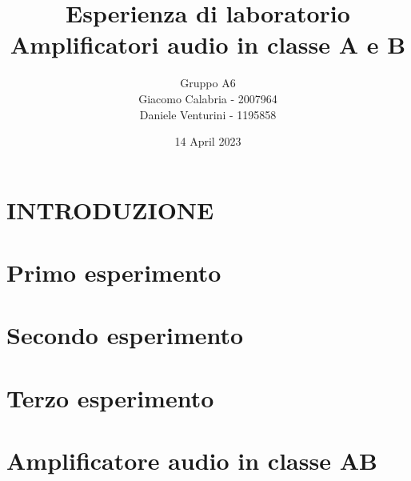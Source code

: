 \documentclass{article}
\title{Esperienza di laboratorio\\\textbf{Amplificatori audio in classe A e B}}
\author{Gruppo A6\\Giacomo Calabria - 2007964\\Daniele Venturini - 1195858}
\date{14 April 2023}
\begin{document}
    \maketitle
    \tableofcontents
    \clearpage
    
    \section*{INTRODUZIONE}
    
    \clearpage
    
    \section{Primo esperimento}
    
    
    \section{Secondo esperimento}
    
    
    \section{Terzo esperimento}
    
    \clearpage
    
    \section{Amplificatore audio in classe AB}
    
\end{document}
